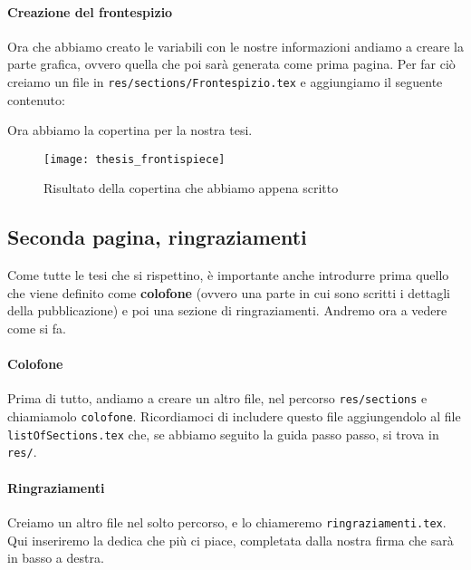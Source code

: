 

\paragraph*{Creazione del frontespizio} Ora che abbiamo creato le variabili con
le nostre informazioni andiamo a creare la parte grafica, ovvero quella che poi
sarà generata come prima pagina. Per far ciò creiamo un file in
\texttt{res/sections/Frontespizio.tex} e aggiungiamo il seguente contenuto:



\noindent Ora abbiamo la copertina per la nostra tesi.

\begin{figure}[t]
 \centering
 \texttt{[image: thesis\_frontispiece]}
 \caption[Frontespizio tesi]{Risultato della copertina che abbiamo appena
scritto}
 \label{img:thesis_frontispiece}
\end{figure}


\subsection{Seconda pagina, ringraziamenti}
Come tutte le tesi che si rispettino, è importante anche introdurre prima
quello che viene definito come \textbf{colofone} (ovvero una parte in cui sono
scritti i dettagli della pubblicazione) e poi una sezione di ringraziamenti.
Andremo ora a vedere come si fa.
\paragraph*{Colofone} Prima di tutto, andiamo a creare un altro
file, nel percorso \texttt{res/sections} e chiamiamolo \texttt{colofone}.
Ricordiamoci di includere questo file aggiungendolo al file
\texttt{listOfSections.tex} che, se abbiamo seguito la guida passo passo, si
trova in \texttt{res/}.



\paragraph*{Ringraziamenti} Creiamo un altro file nel solto percorso, e lo
chiameremo \texttt{ringraziamenti.tex}. Qui inseriremo la dedica che più ci
piace, completata dalla nostra firma che sarà in basso a destra.




